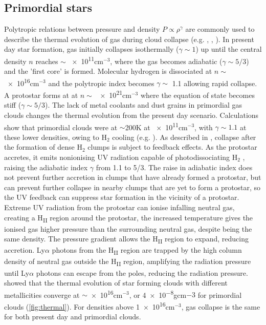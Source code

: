 \documentclass[11pt]{article}
\begin{document}
\subsection{Primordial stars}
\label{sub:presVSprim}
Polytropic relations between pressure and density $P \propto \rho^\gamma$ are commonly used to describe the thermal evolution of gas during cloud collapse (e.g. \citealt{Hennebelle2008}, \citealt{Machida2008a}, \citealt{Tomisaka2002}). In present day star formation, gas initially collapses isothermally ($\gamma \sim 1$) up until the central density $n$ reaches $\sim$ \num{e11}cm$^{-3}$, where the gas becomes adiabatic ($\gamma \sim 5/3$) and the 'first core' is formed. Molecular hydrogen is dissociated at  $n \sim$ \num{e16}cm$^{-3}$ and the polytropic index becomes $\gamma \sim$ 1.1 allowing rapid collapse. A protostar forms at at $n \sim$ \num{e21}cm$^{-3}$ where the equation of state becomes stiff ($\gamma \sim 5/3$). The lack of metal coolants and dust grains in primordial gas clouds changes the thermal evolution from the present day scenario. Calculations show that primordial clouds were at $\sim$200K at \num{e11}cm$^{-3}$, with $\gamma \sim 1.1$ at these lower densities, owing to H$_{2}$ cooling (e.g. \citealt{Omukai1998}). As described in \cite{McKee2008}, collapse after the formation of dense H$_{2}$ clumps is subject to feedback effects. As the protostar accretes, it emits nonionising UV radiation capable of photodissociating H$_{2}$ , raising the adiabatic index $\gamma$ from 1.1 to 5/3. The raise in adiabatic index does not prevent further accretion in clumps that have already formed a protostar, but can prevent further collapse in nearby clumps that are yet to form a protostar, so the UV feedback can suppress star formation in the vicinity of a protostar. Extreme UV radiation from the protostar can ionise infalling neutral gas, creating a H\textsubscript{II} region around the protostar, the increased temperature gives the ionised gas higher pressure than the surrounding neutral gas, despite being the same density. The pressure gradient allows the H\textsubscript{II} region to expand, reducing accretion. Ly$\alpha$ photons from the H\textsubscript{II} region are trapped by the high column density of neutral gas outside the H\textsubscript{II}  region, amplifying the radiation pressure until Ly$\alpha$ photons can escape from the poles, reducing the radiation pressure. \cite{Omukai2005} showed that the thermal evolution of star forming clouds with different metallicities converge at $\sim$\num{e16}cm$^{-3}$, or \num{4e-8}gcm${-3}$ for primordial clouds (\autoref{fig:thermal}). For densities above \num{1e16}cm$^{-3}$, gas collapse is the same for both present day and primordial clouds. 
\end{document}
